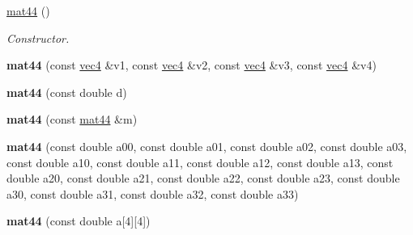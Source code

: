 \begin{DoxyCompactItemize}
\item 
\hypertarget{classutil_1_1math_1_1mat44_a06ebc9496c70ab44ccf34da61213f147}{\hyperlink{classutil_1_1math_1_1mat44_a06ebc9496c70ab44ccf34da61213f147}{mat44} ()}\label{classutil_1_1math_1_1mat44_a06ebc9496c70ab44ccf34da61213f147}

\begin{DoxyCompactList}\small\item\em \-Constructor. \end{DoxyCompactList}\item 
\hypertarget{classutil_1_1math_1_1mat44_abf980f9569eb66cb03659e6ed8c3927f}{{\bfseries mat44} (const \hyperlink{classutil_1_1math_1_1vec4}{vec4} \&v1, const \hyperlink{classutil_1_1math_1_1vec4}{vec4} \&v2, const \hyperlink{classutil_1_1math_1_1vec4}{vec4} \&v3, const \hyperlink{classutil_1_1math_1_1vec4}{vec4} \&v4)}\label{classutil_1_1math_1_1mat44_abf980f9569eb66cb03659e6ed8c3927f}

\item 
\hypertarget{classutil_1_1math_1_1mat44_a274ea9c05adc44eb08a0cd436132e243}{{\bfseries mat44} (const double d)}\label{classutil_1_1math_1_1mat44_a274ea9c05adc44eb08a0cd436132e243}

\item 
\hypertarget{classutil_1_1math_1_1mat44_a6f8ccb6e78cb1dd3a1a71ce9f4e72eb6}{{\bfseries mat44} (const \hyperlink{classutil_1_1math_1_1mat44}{mat44} \&m)}\label{classutil_1_1math_1_1mat44_a6f8ccb6e78cb1dd3a1a71ce9f4e72eb6}

\item 
\hypertarget{classutil_1_1math_1_1mat44_a7a7f2c2be4f321cf7a70248a6801e31c}{{\bfseries mat44} (const double a00, const double a01, const double a02, const double a03, const double a10, const double a11, const double a12, const double a13, const double a20, const double a21, const double a22, const double a23, const double a30, const double a31, const double a32, const double a33)}\label{classutil_1_1math_1_1mat44_a7a7f2c2be4f321cf7a70248a6801e31c}

\item 
\hypertarget{classutil_1_1math_1_1mat44_a554571a5b37b73dd556a1032c20c4266}{{\bfseries mat44} (const double a\mbox{[}4\mbox{]}\mbox{[}4\mbox{]})}\label{classutil_1_1math_1_1mat44_a554571a5b37b73dd556a1032c20c4266}

\end{DoxyCompactItemize}

